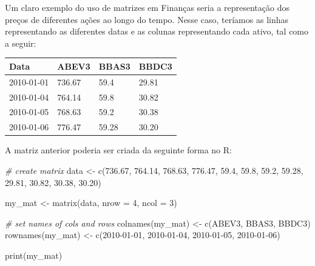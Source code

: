 \documentclass[
  11pt,
]{book}
\newenvironment{Shaded}{\begin{snugshade}}{\end{snugshade}}
\newcommand{\AttributeTok}[1]{\textcolor[rgb]{0.61,0.61,0.61}{#1}}
\newcommand{\CommentTok}[1]{\textcolor[rgb]{0.37,0.37,0.37}{\textit{#1}}}
\newcommand{\DecValTok}[1]{\textcolor[rgb]{0.06,0.06,0.06}{#1}}
\newcommand{\FloatTok}[1]{\textcolor[rgb]{0.06,0.06,0.06}{#1}}
\newcommand{\FunctionTok}[1]{\textcolor[rgb]{0,0,0}{#1}}
\newcommand{\NormalTok}[1]{#1}
\newcommand{\OtherTok}[1]{\textcolor[rgb]{0.37,0.37,0.37}{#1}}
\newcommand{\StringTok}[1]{\textcolor[rgb]{0.5,0.5,0.5}{#1}}
\begin{document}
Um claro exemplo do uso de matrizes em Finanças seria a representação dos preços de diferentes ações ao longo do tempo. Nesse caso, teríamos as linhas representando as diferentes datas e as colunas representando cada ativo, tal como a seguir:

\begin{longtable}[]{@{}llll@{}}
\toprule()
Data & ABEV3 & BBAS3 & BBDC3 \\
\midrule()
\endhead
2010-01-01 & 736.67 & 59.4 & 29.81 \\
2010-01-04 & 764.14 & 59.8 & 30.82 \\
2010-01-05 & 768.63 & 59.2 & 30.38 \\
2010-01-06 & 776.47 & 59.28 & 30.20 \\
\bottomrule()
\end{longtable}

A matriz anterior poderia ser criada da seguinte forma no R:

\begin{Shaded}
\begin{Highlighting}[]
\CommentTok{\# create matrix}
\NormalTok{data }\OtherTok{\textless{}{-}} \FunctionTok{c}\NormalTok{(}\FloatTok{736.67}\NormalTok{, }\FloatTok{764.14}\NormalTok{, }\FloatTok{768.63}\NormalTok{, }\FloatTok{776.47}\NormalTok{,}
          \FloatTok{59.4}\NormalTok{, }\FloatTok{59.8}\NormalTok{, }\FloatTok{59.2}\NormalTok{, }\FloatTok{59.28}\NormalTok{,}
          \FloatTok{29.81}\NormalTok{, }\FloatTok{30.82}\NormalTok{, }\FloatTok{30.38}\NormalTok{, }\FloatTok{30.20}\NormalTok{)}

\NormalTok{my\_mat }\OtherTok{\textless{}{-}} \FunctionTok{matrix}\NormalTok{(data, }\AttributeTok{nrow =} \DecValTok{4}\NormalTok{, }\AttributeTok{ncol =} \DecValTok{3}\NormalTok{)}

\CommentTok{\# set names of cols and rows}
\FunctionTok{colnames}\NormalTok{(my\_mat) }\OtherTok{\textless{}{-}} \FunctionTok{c}\NormalTok{(}\StringTok{\textquotesingle{}ABEV3\textquotesingle{}}\NormalTok{, }\StringTok{\textquotesingle{}BBAS3\textquotesingle{}}\NormalTok{, }\StringTok{\textquotesingle{}BBDC3\textquotesingle{}}\NormalTok{)}
\FunctionTok{rownames}\NormalTok{(my\_mat) }\OtherTok{\textless{}{-}} \FunctionTok{c}\NormalTok{(}\StringTok{\textquotesingle{}2010{-}01{-}01\textquotesingle{}}\NormalTok{, }\StringTok{\textquotesingle{}2010{-}01{-}04\textquotesingle{}}\NormalTok{,}
                      \StringTok{\textquotesingle{}2010{-}01{-}05\textquotesingle{}}\NormalTok{, }\StringTok{\textquotesingle{}2010{-}01{-}06\textquotesingle{}}\NormalTok{)}

\FunctionTok{print}\NormalTok{(my\_mat)}
\end{Highlighting}
\end{Shaded}
\end{document}
